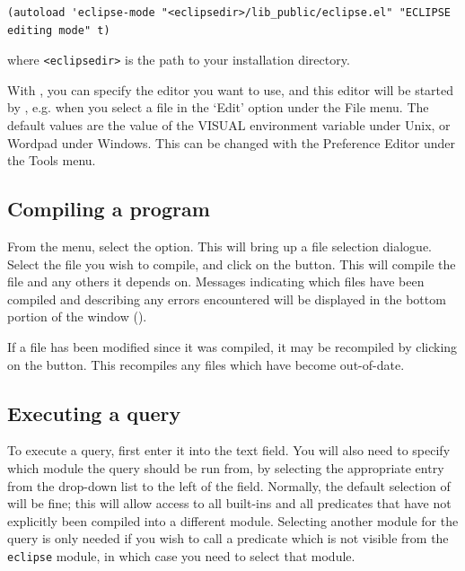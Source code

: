 \begin{small}
\begin{verbatim}
(autoload 'eclipse-mode "<eclipsedir>/lib_public/eclipse.el" "ECLIPSE editing mode" t)
\end{verbatim}
\end{small}

where \texttt{<eclipsedir>} is the path to your {\eclipse} installation
directory. 
 
With {\tkeclipse}, you can specify the editor you want to use, and this
editor will be started by {\tkeclipse}, e.g. when you select a file in
the `Edit' option under the File menu. The default values are the value of
the VISUAL environment variable  under Unix, or Wordpad under Windows.
This can be changed with the Preference Editor under the Tools menu.

\subsection{Compiling a program}

From the  menu, select the  option.
This will bring up a file selection dialogue.  Select the file you wish
to compile, and click on the  button.  This will compile
the file and any others it depends on.  Messages indicating which
files have been compiled and describing any errors encountered will be
displayed in the bottom portion of the {\tkeclipse} window
().

If a file has been modified since it was compiled, it may be
recompiled by clicking on the  button.  This recompiles
any files which have become out-of-date.


\subsection{Executing a query}

To execute a query, first enter it into the  text
field.  You will also need to specify which module the query should be
run from, by selecting the appropriate entry from the drop-down list
to the left of the  field.  Normally, the default
selection of  will be fine; this will allow access to
all {\eclipse} built-ins and all predicates that have not explicitly
been compiled into a different module.  Selecting another module for
the query is only needed if you wish to call a predicate which is not
visible from the {\tt eclipse} module, in which case you need to
select that module.  

